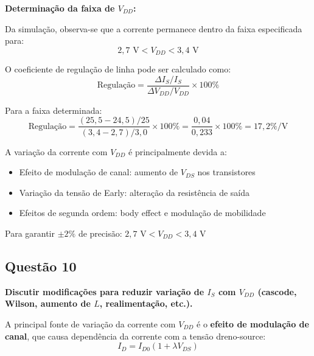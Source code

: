 ﻿\documentclass[12pt,a4paper]{article}
\begin{document}
\textbf{Determinação da faixa de $V_{DD}$:}

Da simulação, observa-se que a corrente permanece dentro da faixa especificada para:
\begin{equation}
2,7 \text{ V} < V_{DD} < 3,4 \text{ V}
\end{equation}



O coeficiente de regulação de linha pode ser calculado como:
\begin{equation*}
\text{Regulação} = \frac{\Delta I_S / I_S}{\Delta V_{DD} / V_{DD}} \times 100\%
\end{equation*}

Para a faixa determinada:
\begin{equation*}
\text{Regulação} = \frac{(25,5-24,5)/25}{(3,4-2,7)/3,0} \times 100\% = \frac{0,04}{0,233} \times 100\% = 17,2\%/\text{V}
\end{equation*}



A variação da corrente com $V_{DD}$ é principalmente devida a:
\begin{itemize}
    \item Efeito de modulação de canal: aumento de $V_{DS}$ nos transistores
    \item Variação da tensão de Early: alteração da resistência de saída
    \item Efeitos de segunda ordem: body effect e modulação de mobilidade
\end{itemize}



Para garantir $\pm 2\%$ de precisão: $\boxed{2,7 \text{ V} < V_{DD} < 3,4 \text{ V}}$

\subsection*{Questão 10}
	\textbf{Discutir modificações para reduzir variação de $I_S$ com $V_{DD}$ (cascode, Wilson, aumento de $L$, realimentação, etc.).}



A principal fonte de variação da corrente com $V_{DD}$ é o \textbf{efeito de modulação de canal}, que causa dependência da corrente com a tensão dreno-source:
\begin{equation}
I_D = I_{D0}(1 + \lambda V_{DS})
\end{equation}
\end{document}
